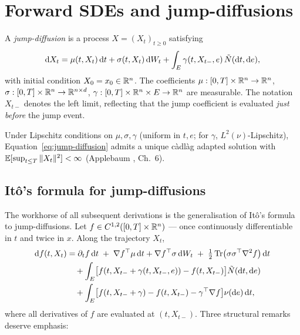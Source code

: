 \section{Forward SDEs and jump-diffusions}
\label{sec:sde-review}

A \emph{jump-diffusion} is a process $X = (X_t)_{t \geq 0}$ satisfying
\begin{equation}
  \mathrm{d} X_t = \mu(t, X_t) \, \mathrm{d} t + \sigma(t, X_t) \, \mathrm{d} W_t + \int_E \gamma(t, X_{t-}, e) \, \tilde N(\mathrm{d} t, \mathrm{d} e),
  \label{eq:jump-diffusion}
\end{equation}
with initial condition $X_0 = x_0 \in \mathbb{R}^n$. The coefficients $\mu : [0, T] \times \mathbb{R}^n \to \mathbb{R}^n$, $\sigma : [0, T] \times \mathbb{R}^n \to \mathbb{R}^{n \times d}$, $\gamma : [0, T] \times \mathbb{R}^n \times E \to \mathbb{R}^n$ are measurable. The notation $X_{t-}$ denotes the left limit, reflecting that the jump coefficient is evaluated \emph{just before} the jump event.

Under Lipschitz conditions on $\mu, \sigma, \gamma$ (uniform in $t, e$; for $\gamma$, $L^2(\nu)$-Lipschitz), Equation~\eqref{eq:jump-diffusion} admits a unique c\`adl\`ag adapted solution with $\mathbb{E}[\sup_{t \leq T} \|X_t\|^2] < \infty$ (Applebaum \cite{applebaum2009}, Ch.~6).

\subsection{It\^o's formula for jump-diffusions}

The workhorse of all subsequent derivations is the generalisation of It\^o's formula to jump-diffusions. Let $f \in C^{1,2}([0, T] \times \mathbb{R}^n)$ --- once continuously differentiable in $t$ and twice in $x$. Along the trajectory $X_t$,
\begin{align}
  \mathrm{d} f(t, X_t) &= \partial_t f \, \mathrm{d} t \;+\; \nabla f^\top \mu \, \mathrm{d} t + \nabla f^\top \sigma \, \mathrm{d} W_t \;+\; \tfrac{1}{2} \operatorname{Tr}\bigl(\sigma \sigma^\top \nabla^2 f\bigr) \, \mathrm{d} t \nonumber \\
  &\quad + \int_E \bigl[f(t, X_{t-} + \gamma(t, X_{t-}, e)) - f(t, X_{t-})\bigr] \tilde N(\mathrm{d} t, \mathrm{d} e) \nonumber \\
  &\quad + \int_E \bigl[f(t, X_{t-} + \gamma) - f(t, X_{t-}) - \gamma^\top \nabla f\bigr] \nu(\mathrm{d} e) \, \mathrm{d} t,
  \label{eq:jump-ito}
\end{align}
where all derivatives of $f$ are evaluated at $(t, X_{t-})$. Three structural remarks deserve emphasis:


